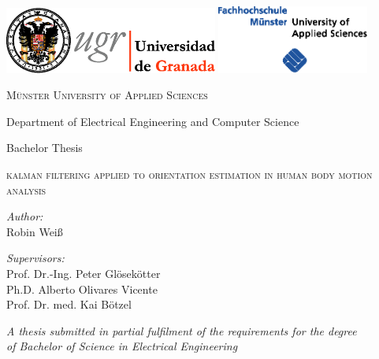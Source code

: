 \begin{titlepage}
\label{ch:titlepage}

\begin{center}

\includegraphics[width=7cm]{Figures/universidad_de_granada.eps}
	\hfill
\includegraphics[width=5cm]{Figures/fh-muenster.eps} 

\vspace{2.5cm}

{\large \textsc{Münster University of Applied Sciences}}

Department of Electrical Engineering and Computer Science

\vspace{1.5cm}

{\large Bachelor Thesis}

\vspace{0.8cm}

\begin{LARGE}
\textsc{kalman filtering applied to orientation estimation in human body motion analysis}
\end{LARGE}

\vspace{1.8cm}

\begin{minipage}{0.4\textwidth}
\begin{flushleft}
\emph{Author:} \\
Robin Weiß
\end{flushleft}
\end{minipage}
\hfill
\begin{minipage}{0.5\textwidth}
\begin{flushright}
\emph{Supervisors:} \\
Prof. Dr.-Ing. Peter Glösekötter \\
Ph.D. Alberto Olivares Vicente \\
Prof. Dr. med. Kai Bötzel
\end{flushright}
\end{minipage}

\vspace{2.0cm}
	
\textit{A thesis submitted in partial fulfilment of the requirements for the degree\\
of Bachelor of Science in Electrical Engineering}

\vfill

\monthname \: \the\year 

\end{center}

\end{titlepage}
